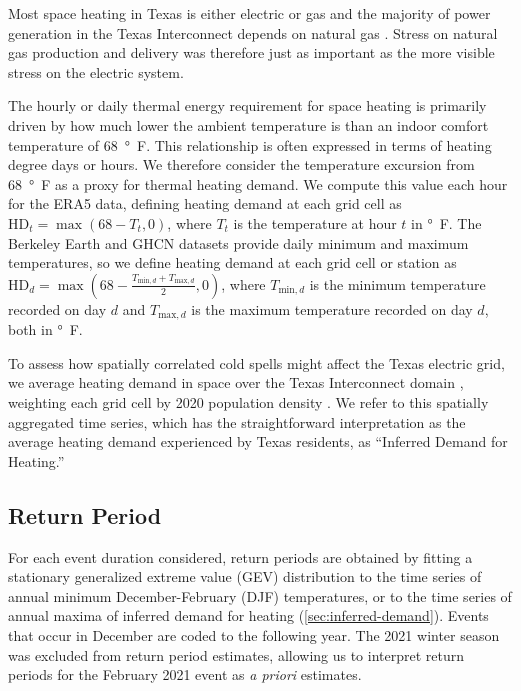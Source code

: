 \documentclass[12pt]{iopart}
\begin{document}
Most space heating in Texas is either electric or gas \cite{waite_heating:2020} and the majority of power generation in the Texas Interconnect depends on natural gas \cite{everhart_iea:2021}.
Stress on natural gas production and delivery was therefore just as important as the more visible stress on the electric system.

The hourly or daily thermal energy requirement for space heating is primarily driven by how much lower the ambient temperature is than an indoor comfort temperature of \SI{68}{\degree F}.
This relationship is often expressed in terms of heating degree days or hours.
We therefore consider the temperature excursion from \SI{68}{\degree F} as a proxy for thermal heating demand.
We compute this value each hour for the ERA5 data, defining heating demand at each grid cell as $\text{HD}_t = \max (68 - T_t, 0)$, where $T_t$ is the temperature at hour $t$ in \si{\degree F}.
The Berkeley Earth and GHCN datasets provide daily minimum and maximum temperatures, so we define heating demand at each grid cell or station as $\text{HD}_d = \max (68 -\frac{T_{\text{min},d} + T_{\text{max},d}}{2}, 0)$, where $T_{\text{min},d}$ is the minimum temperature recorded on day $d$ and $T_{\text{max},d}$ is the maximum temperature recorded on day $d$, both in \si{\degree F}.

To assess how spatially correlated cold spells might affect the Texas electric grid, we average heating demand in space over the Texas Interconnect domain \cite{useia_regions:2021}, weighting each grid cell by 2020 population density \cite{ciesin_gpwv4:2016}.
We refer to this spatially aggregated time series, which has the straightforward interpretation as the average heating demand experienced by Texas residents, as ``Inferred Demand for Heating.''

\subsection{Return Period}

For each event duration considered, return periods are obtained by fitting a stationary generalized extreme value (GEV) distribution to the time series of annual minimum December-February (DJF) temperatures, or to the time series of annual maxima of inferred demand for heating (\cref{sec:inferred-demand}).
Events that occur in December are coded to the following year.
The 2021 winter season was excluded from return period estimates, allowing us to interpret return periods for the February 2021 event as \emph{a priori} estimates.
\end{document}
